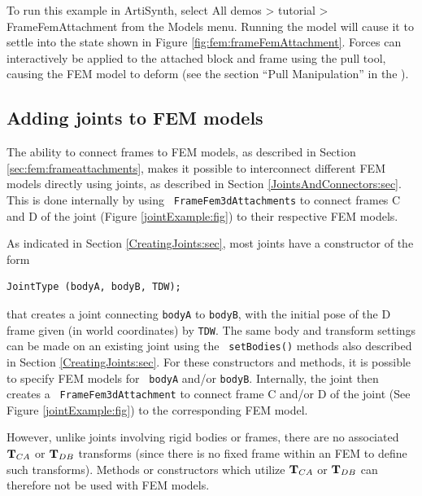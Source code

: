 To run this example in ArtiSynth, select {\sf All demos > tutorial >
FrameFemAttachment} from the {\sf Models} menu. Running the model will
cause it to settle into the state shown in Figure
\ref{fig:fem:frameFemAttachment}. Forces can interactively
be applied to the attached block and frame using the
pull tool, causing the FEM model to deform 
(see the section ``Pull Manipulation'' in the
).

\subsection{Adding joints to FEM models}
\label{FEMJoints:sec}

The ability to connect frames to FEM models, as described in Section
\ref{sec:fem:frameattachments}, makes it possible to interconnect
different FEM models directly using joints, as described in Section
\ref{JointsAndConnectors:sec}. This is done internally by using {\tt
FrameFem3dAttachments} to connect frames C and D of the joint (Figure
\ref{jointExample:fig}) to their respective FEM models.

As indicated in Section \ref{CreatingJoints:sec}, most
joints have a constructor of the form
%
\begin{lstlisting}[]
  JointType (bodyA, bodyB, TDW);
\end{lstlisting}
%
that creates a joint connecting {\tt bodyA} to {\tt bodyB}, with the initial
pose of the D frame given (in world coordinates) by {\tt TDW}.  The same body
and transform settings can be made on an existing joint using the {\tt
setBodies()} methods also described in Section \ref{CreatingJoints:sec}.  For
these constructors and methods, it is possible to specify FEM models for {\tt
bodyA} and/or {\tt bodyB}. Internally, the joint then creates a {\tt
FrameFem3dAttachment} to connect frame C and/or D of the joint (See
Figure \ref{jointExample:fig}) to the corresponding FEM model.

However, unlike joints involving rigid bodies or frames, there are no
associated ${\bf T}_{CA}$ or ${\bf T}_{DB}$ transforms (since there is no fixed
frame within an FEM to define such transforms).  Methods or
constructors which utilize ${\bf T}_{CA}$ or ${\bf T}_{DB}$ can therefore
not be used with FEM models.

